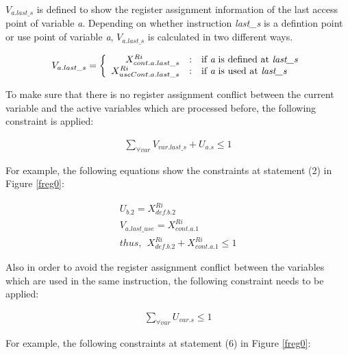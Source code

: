 $V_{a.last\_s}$ is defined to show the register assignment information of the last access
point of variable {\it a}. 
Depending on whether instruction {\it last\_s} is a defintion point or use point of variable {\it a}, 
$V_{a.last\_s}$ is calculated in two different ways.

\begin{small}
\begin{eqnarray}
V_{a.last\_s} = \left\{\begin{array}{r@{\quad:\quad}l} 
X_{cont.a.last\_s}^{Ri} & \mbox{if {\it a} is defined at {\it last\_s}} \\ 
X_{useCont.a.last\_s}^{Ri} &\mbox{if {\it a} is used at {\it last\_s}} \end{array}\right. 
\end{eqnarray}
\end{small}

To make sure that there is no register assignment conflict between the current
variable and the active variables which are processed before, the following constraint
is applied:

\begin{small}
\begin{eqnarray}
\sum_{\forall var}V_{var.last\_s} + U_{a.s} \leq 1 
\end{eqnarray}
\end{small}

For example, the following equations show the constraints at statement (2) in
Figure \ref{freg0}:
\begin{small}
\begin{eqnarray}
U_{b.2} = X_{def.b.2}^{Ri}\nonumber\\
V_{a.last\_use} = X_{cont.a.1}^{Ri}\nonumber \\
thus, ~~X_{def.b.2}^{Ri} + X_{cont.a.1}^{Ri} \leq 1
\end{eqnarray}
\end{small}

Also in order to avoid the register assignment conflict between the variables which
are used in the same instruction, the following constraint needs to be applied:
\begin{small}
\begin{eqnarray}
\sum_{\forall var}U_{var.s} \leq 1 
\end{eqnarray}
\end{small}

For example, the following constraints at statement (6) in Figure \ref{freg0}:

